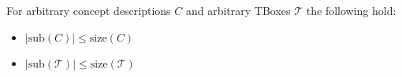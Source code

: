 
\begin{lemma}
	For arbitrary concept descriptions $C$ and arbitrary TBoxes $ \mathcal{T}$ the following hold:
	\begin{itemize}
		\item $\left| \text{sub}(C) \right| \leq \text{size}(C)$ 
		\item $\left| \text{sub}(\mathcal{T}) \right| \leq \text{size}(\mathcal{T})$
	\end{itemize}
\end{lemma}
